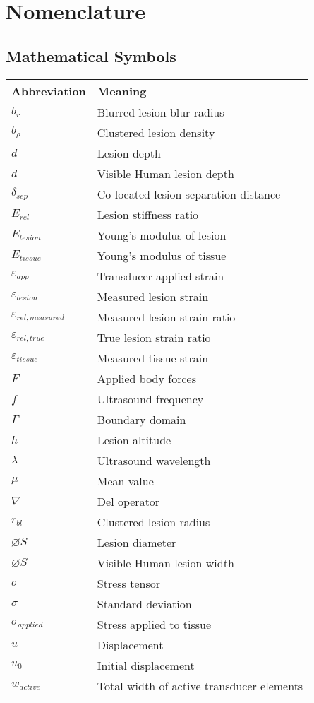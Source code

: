\chapter*{Nomenclature}
	\section*{Mathematical Symbols}
		\begin{longtable}[l]{ll}
			Abbreviation & Meaning \\
			\hline \endhead
			$b_r$ & Blurred lesion blur radius \\
			$b_\rho$ & Clustered lesion density \\
			$d$ & Lesion depth \\
			$d$ & Visible Human lesion depth \\
			$\delta_{sep}$ & Co-located lesion separation distance \\
			$E_{rel}$ & Lesion stiffness ratio \\
			$E_{lesion}$ & Young's modulus of lesion \\
			$E_{tissue}$ & Young's modulus of tissue \\
			$\varepsilon_{app}$ & Transducer-applied strain \\
			$\varepsilon_{lesion}$ & Measured lesion strain \\
			$\varepsilon_{rel,measured}$ & Measured lesion strain ratio \\
			$\varepsilon_{rel,true}$ & True lesion strain ratio \\
			$\varepsilon_{tissue}$ & Measured tissue strain \\
			$F$ & Applied body forces \\
			$f$ & Ultrasound frequency \\
			$\Gamma$ & Boundary domain \\
			$h$ & Lesion altitude \\
			$\lambda$ & Ultrasound wavelength \\
			$\mu$ & Mean value \\
			$\nabla$ & Del operator \\
			$r_{bl}$ & Clustered lesion radius \\
			$\diameter S$ & Lesion diameter \\
			$\diameter S$ & Visible Human lesion width \\
			$\sigma$ & Stress tensor \\
			$\sigma$ & Standard deviation \\
			$\sigma_{applied}$ & Stress applied to tissue \\
			$u$ & Displacement \\
			$u_0$ & Initial displacement \\
			$w_{active}$ & Total width of active transducer elements \\
		\end{longtable}

